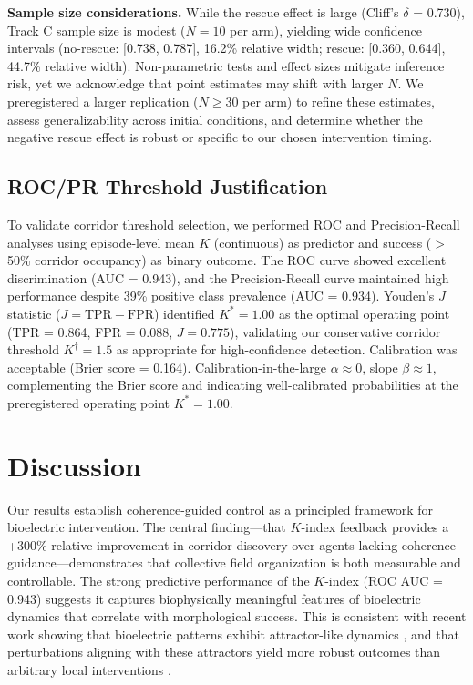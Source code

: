 \documentclass[10pt,letterpaper]{article}
\begin{document}
\textbf{Sample size considerations.} While the rescue effect is large (Cliff's $\delta$ = 0.730), Track C sample size is modest ($N = 10$ per arm), yielding wide confidence intervals (no-rescue: [0.738, 0.787], 16.2\% relative width; rescue: [0.360, 0.644], 44.7\% relative width). Non-parametric tests and effect sizes mitigate inference risk, yet we acknowledge that point estimates may shift with larger $N$. We preregistered a larger replication ($N \geq 30$ per arm) to refine these estimates, assess generalizability across initial conditions, and determine whether the negative rescue effect is robust or specific to our chosen intervention timing.

\subsection*{ROC/PR Threshold Justification}

To validate corridor threshold selection, we performed ROC and Precision-Recall analyses using episode-level mean $K$ (continuous) as predictor and success ($>$50\% corridor occupancy) as binary outcome. The ROC curve showed excellent discrimination (AUC = 0.943), and the Precision-Recall curve maintained high performance despite 39\% positive class prevalence (AUC = 0.934). Youden's $J$ statistic ($J = \text{TPR} - \text{FPR}$) identified $K^* = 1.00$ as the optimal operating point (TPR = 0.864, FPR = 0.088, $J = 0.775$), validating our conservative corridor threshold $K^\dagger = 1.5$ as appropriate for high-confidence detection. Calibration was acceptable (Brier score = 0.164). Calibration-in-the-large $\alpha \approx 0$, slope $\beta \approx 1$, complementing the Brier score and indicating well-calibrated probabilities at the preregistered operating point $K^* = 1.00$.

\section*{Discussion}

Our results establish coherence-guided control as a principled framework for bioelectric intervention. The central finding—that $K$-index feedback provides a +300\% relative improvement in corridor discovery over agents lacking coherence guidance—demonstrates that collective field organization is both measurable and controllable. The strong predictive performance of the $K$-index (ROC AUC = 0.943) suggests it captures biophysically meaningful features of bioelectric dynamics that correlate with morphological success. This is consistent with recent work showing that bioelectric patterns exhibit attractor-like dynamics \cite{levin2021bioelectric}, and that perturbations aligning with these attractors yield more robust outcomes than arbitrary local interventions \cite{cervera2018bioelectrical}.
\end{document}
